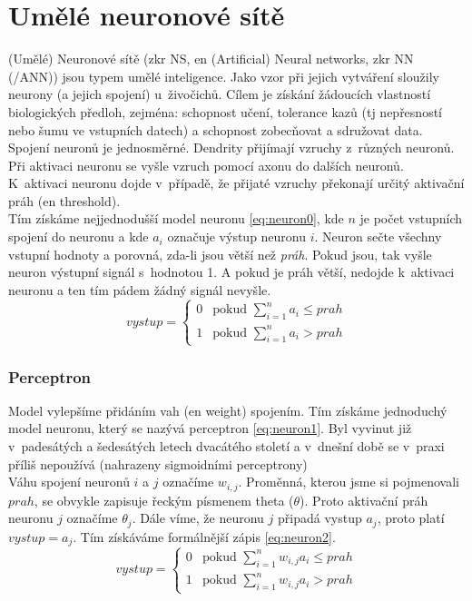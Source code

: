 \documentclass[12pt]{report}			%
\begin{document}
	\section{Umělé neuronové sítě}
	\label{sec:NN-uvod}
	(Umělé) Neuronové sítě (\gls{zkr} \gls{NS}, \gls{en} (Artificial) Neural networks, \gls{zkr} \gls{NN} (/\gls{ANN})) jsou typem umělé inteligence. Jako vzor při jejich vytváření sloužily neurony (a jejich spojení) u~živočichů. Cílem je získání žádoucích vlastností biologických předloh, zejména: schopnost učení, tolerance kazů (\gls{tj} nepřesností nebo šumu ve vstupních datech) a schopnost zobecňovat a sdružovat data. \parencite[\gls{s} 3-5]{NN_introduction-Kriessel}\\
	Spojení neuronů je jednosměrné. Dendrity přijímají vzruchy z~různých neuronů. Při aktivaci neuronu se vyšle vzruch pomocí axonu do dalších neuronů. K~aktivaci neuronu dojde v~případě, že přijaté vzruchy překonají určitý aktivační práh (\gls{en} threshold).\parencite[\gls{str} 21]{NN_introduction-Kriessel}\\
	Tím získáme nejjednodušší model neuronu \eqref{eq:neuron0}, kde $n$ je počet vstupních spojení do neuronu a kde $a_i$ označuje výstup neuronu $i$. Neuron sečte všechny vstupní hodnoty a porovná, zda-li jsou větší než \emph{práh}. Pokud jsou, tak vyšle neuron výstupní signál s~hodnotou 1. A pokud je práh větší, nedojde k~aktivaci neuronu a ten tím pádem žádný signál nevyšle.
	\begin{equation}
	\label{eq:neuron0}
	vystup = 
		\begin{cases}
		0 & \text{pokud $\sum_{i=1}^{n} a_i \leq prah$}\\
		1 & \text{pokud $\sum_{i=1}^{n} a_i > prah$}
		\end{cases}
	\end{equation}
	
	\subsubsection{Perceptron}
	Model vylepšíme přidáním vah (\gls{en} weight) spojením. Tím získáme jednoduchý model neuronu, který se nazývá perceptron \eqref{eq:neuron1}. Byl vyvinut již v~padesátých a šedesátých letech dvacátého století a v~dnešní době se v~praxi příliš nepoužívá (nahrazeny sigmoidními perceptrony)\parencite[\gls{k} 1.1]{NN-Nielsen-web}\\
	Váhu spojení neuronů $i$ a $j$ označíme $w_{i,j}$. Proměnná, kterou jsme si pojmenovali $prah$, se obvykle zapisuje řeckým písmenem theta ($\theta$). Proto aktivační práh neuronu  $j$ označíme $\theta_{j}$. Dále víme, že neuronu $j$ připadá vystup $a_j$, proto platí $vystup=a_j$. Tím získáváme formálnější zápis \eqref{eq:neuron2}.
	\begin{equation}
	\label{eq:neuron1}
	vystup = 
		\begin{cases}
		0 & \text{pokud $\sum_{i=1}^{n} w_{i,j} a_i \leq prah$}\\
		1 & \text{pokud $\sum_{i=1}^{n} w_{i,j} a_i > prah$}
		\end{cases}
	\end{equation}
	
\end{document}
